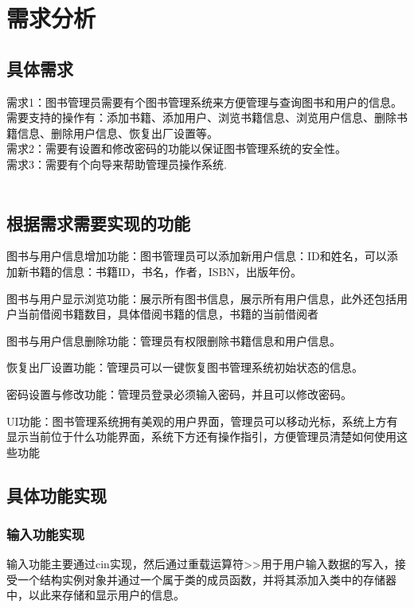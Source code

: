\documentclass{article}
\begin{document}
\setcounter{page}{0}
\tableofcontents
\newpage

\section{需求分析}

\subsection{具体需求}
\noindent
需求1：图书管理员需要有个图书管理系统来方便管理与查询图书和用户的信息。需要支持的操作有：添加书籍、添加用户、浏览书籍信息、浏览用户信息、删除书籍信息、删除用户信息、恢复出厂设置等。\\
需求2：需要有设置和修改密码的功能以保证图书管理系统的安全性。\\
需求3：需要有个向导来帮助管理员操作系统.\\\\

\subsection{根据需求需要实现的功能}
图书与用户信息增加功能：图书管理员可以添加新用户信息：ID和姓名，可以添加新书籍的信息：书籍ID，书名，作者，ISBN，出版年份。

图书与用户显示浏览功能：展示所有图书信息，展示所有用户信息，此外还包括用户当前借阅书籍数目，具体借阅书籍的信息，书籍的当前借阅者

图书与用户信息删除功能：管理员有权限删除书籍信息和用户信息。

恢复出厂设置功能：管理员可以一键恢复图书管理系统初始状态的信息。

密码设置与修改功能：管理员登录必须输入密码，并且可以修改密码。

UI功能：图书管理系统拥有美观的用户界面，管理员可以移动光标，系统上方有显示当前位于什么功能界面，系统下方还有操作指引，方便管理员清楚如何使用这些功能\\
\subsection{具体功能实现}
\subsubsection{输入功能实现}
输入功能主要通过cin实现，然后通过重载运算符\textgreater{}\textgreater{}用于用户输入数据的写入，接受一个结构实例对象并通过一个属于类的成员函数，并将其添加入类中的存储器中，以此来存储和显示用户的信息。\\
\end{document}
